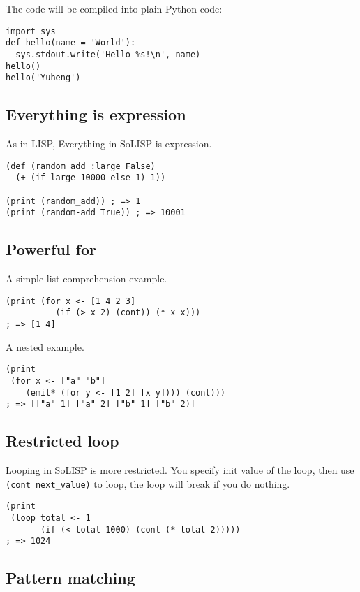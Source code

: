 \documentclass[a4paper,11pt]{article}
\begin{document}
The code will be compiled into plain Python code:

\begin{verbatim}
import sys
def hello(name = 'World'):
  sys.stdout.write('Hello %s!\n', name)
hello()
hello('Yuheng')
\end{verbatim}

\subsection{Everything is expression}

As in LISP, Everything in SoLISP is expression.

\begin{verbatim}
(def (random_add :large False)
  (+ (if large 10000 else 1) 1))

(print (random_add)) ; => 1
(print (random-add True)) ; => 10001
\end{verbatim}


\subsection{Powerful for}

A simple list comprehension example.

\begin{verbatim}
(print (for x <- [1 4 2 3]
          (if (> x 2) (cont)) (* x x)))
; => [1 4]
\end{verbatim}

A nested example.

\begin{verbatim}
(print
 (for x <- ["a" "b"]
    (emit* (for y <- [1 2] [x y]))) (cont)))
; => [["a" 1] ["a" 2] ["b" 1] ["b" 2)]
\end{verbatim}


\subsection{Restricted loop}

Looping in SoLISP is more restricted. You specify init value of the loop, then use \verb|(cont next_value)| to loop, the loop will break if you do nothing.

\begin{verbatim}
(print
 (loop total <- 1
       (if (< total 1000) (cont (* total 2)))))
; => 1024
\end{verbatim}

\subsection{Pattern matching}
\end{document}
